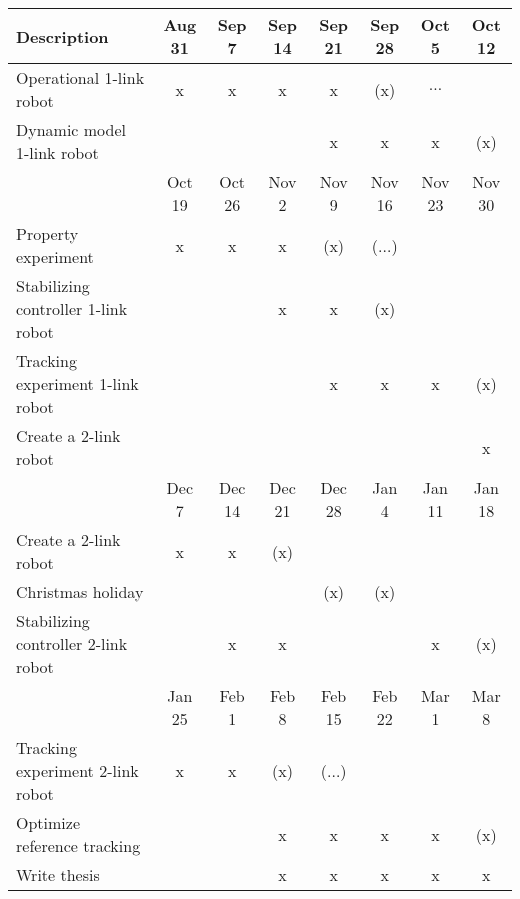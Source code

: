 \begin{table}[H]
    \centering
    \begin{tabular}{p{5cm}ccccccc} \hline
      \textbf{Description}        & Aug 31 & Sep 7 & Sep 14 & Sep 21 & Sep 28 & Oct 5 & Oct 12\\ \hline
      Operational 1-link robot    & x      & x     & x      & x      & (x)      & $\dots$ &    \\ 
      Dynamic model 1-link robot  &        &       &        &  x      & x      & x     &  (x)   \\ \hline
 
                                  & Oct 19 & Oct 26 & Nov 2 & Nov 9 & Nov 16 & Nov 23 & Nov 30  \\ \hline
     Property experiment          & x      & x        & x    & (x)  & ($\dots$) &        &           \\    
     Stabilizing controller 1-link robot &  &         & x    & x    & (x)    &        &          \\      
     Tracking experiment 1-link robot  &        &       &        &    x    & x     & x     &  (x)  \\  
     Create a 2-link robot        &    &        &      &       &        &        &  x        \\ \hline
      
                                  & Dec 7 & Dec 14 & Dec 21 & Dec 28 & Jan 4 & Jan 11 & Jan 18  \\ \hline
     Create a 2-link robot        & x   &    x     &   (x)   &       &        &        &          \\ 
     Christmas holiday            &     &         &          & (x)   & (x)    &        &           \\    
     Stabilizing controller 2-link robot &  &  x   &     x    &       &        &    x    &   (x)       \\    \hline  
      
                                  & Jan 25 & Feb 1 & Feb 8 & Feb 15 & Feb 22 & Mar 1 & Mar 8 \\ \hline
    Tracking experiment 2-link robot & x   &    x     &   (x)   & ($\dots$)  &        &        &          \\ 
    Optimize reference tracking      &    &           &    x      & x      &  x &      x  &   (x) \\
    Write thesis                    &      &        &     x     &    x        &   x     &    x    &   x      \\    \hline  



\end{tabular}
\end{table}

